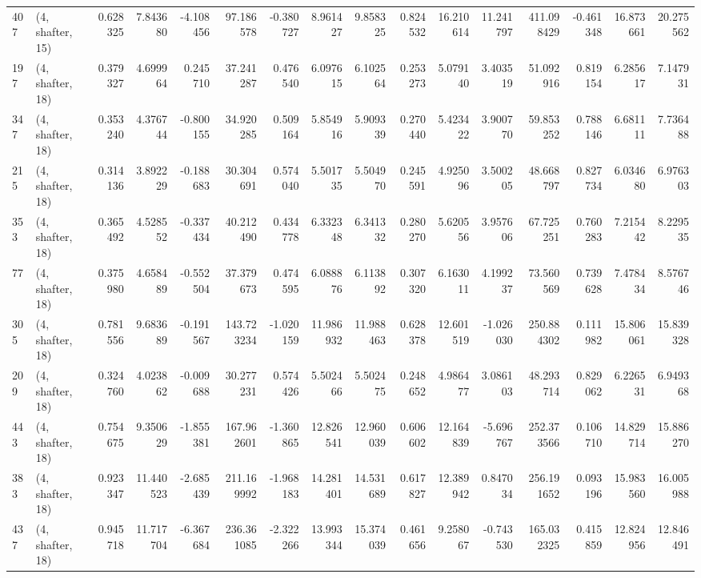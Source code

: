 \begin{tabular}{llrrrrrrrrrrrrrr}
407 &  (4, shafter, 15) &   0.628325 &   7.843680 &  -4.108456 &    97.186578 &  -0.380727 &   8.961427 &   9.858325 &  0.824532 &  16.210614 &  11.241797 &    411.098429 &   -0.461348 &   16.873661 &   20.275562 \\
197 &  (4, shafter, 18) &   0.379327 &   4.699964 &   0.245710 &    37.241287 &   0.476540 &   6.097615 &   6.102564 &  0.253273 &   5.079140 &   3.403519 &     51.092916 &    0.819154 &    6.285617 &    7.147931 \\
347 &  (4, shafter, 18) &   0.353240 &   4.376744 &  -0.800155 &    34.920285 &   0.509164 &   5.854916 &   5.909339 &  0.270440 &   5.423422 &   3.900770 &     59.853252 &    0.788146 &    6.681111 &    7.736488 \\
215 &  (4, shafter, 18) &   0.314136 &   3.892229 &  -0.188683 &    30.304691 &   0.574040 &   5.501735 &   5.504970 &  0.245591 &   4.925096 &   3.500205 &     48.668797 &    0.827734 &    6.034680 &    6.976303 \\
353 &  (4, shafter, 18) &   0.365492 &   4.528552 &  -0.337434 &    40.212490 &   0.434778 &   6.332348 &   6.341332 &  0.280270 &   5.620556 &   3.957606 &     67.725251 &    0.760283 &    7.215442 &    8.229535 \\
77  &  (4, shafter, 18) &   0.375980 &   4.658489 &  -0.552504 &    37.379673 &   0.474595 &   6.088876 &   6.113892 &  0.307320 &   6.163011 &   4.199237 &     73.560569 &    0.739628 &    7.478434 &    8.576746 \\
305 &  (4, shafter, 18) &   0.781556 &   9.683689 &  -0.191567 &   143.723234 &  -1.020159 &  11.986932 &  11.988463 &  0.628378 &  12.601519 &  -1.026030 &    250.884302 &    0.111982 &   15.806061 &   15.839328 \\
209 &  (4, shafter, 18) &   0.324760 &   4.023862 &  -0.009688 &    30.277231 &   0.574426 &   5.502466 &   5.502475 &  0.248652 &   4.986477 &   3.086103 &     48.293714 &    0.829062 &    6.226531 &    6.949368 \\
443 &  (4, shafter, 18) &   0.754675 &   9.350629 &  -1.855381 &   167.962601 &  -1.360865 &  12.826541 &  12.960039 &  0.606602 &  12.164839 &  -5.696767 &    252.373566 &    0.106710 &   14.829714 &   15.886270 \\
383 &  (4, shafter, 18) &   0.923347 &  11.440523 &  -2.685439 &   211.169992 &  -1.968183 &  14.281401 &  14.531689 &  0.617827 &  12.389942 &   0.847034 &    256.191652 &    0.093196 &   15.983560 &   16.005988 \\
437 &  (4, shafter, 18) &   0.945718 &  11.717704 &  -6.367684 &   236.361085 &  -2.322266 &  13.993344 &  15.374039 &  0.461656 &   9.258067 &  -0.743530 &    165.032325 &    0.415859 &   12.824956 &   12.846491 \\

\end{tabular}
